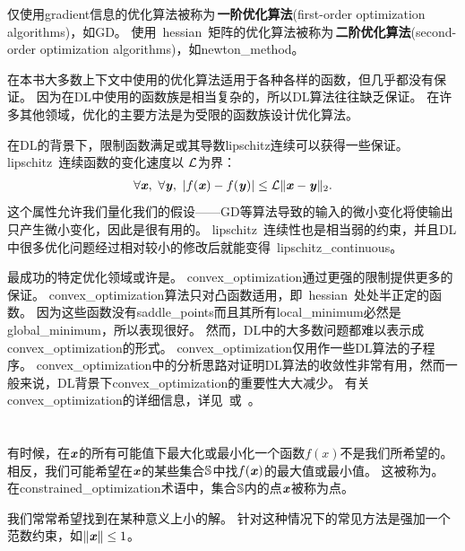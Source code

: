 仅使用\gls{gradient}信息的优化算法被称为\,\textbf{一阶优化算法}(first-order optimization algorithms)，如\gls{GD}。
使用~\gls{hessian}~矩阵的优化算法被称为\,\textbf{二阶优化算法}(second-order optimization algorithms)\citep{NumOptBook}，如\gls{newton_method}。

在本书大多数上下文中使用的优化算法适用于各种各样的函数，但几乎都没有保证。
因为在\gls{DL}中使用的函数族是相当复杂的，所以\gls{DL}算法往往缺乏保证。
在许多其他领域，优化的主要方法是为受限的函数族设计优化算法。

在\gls{DL}的背景下，限制函数满足或其导数\gls{lipschitz}连续可以获得一些保证。
\gls{lipschitz}~连续函数的变化速度以 $\mathcal{L}$为界：
\begin{align}
 \forall \boldsymbol{\mathit{x}},~\forall \boldsymbol{\mathit{y}}, ~| f(\boldsymbol{\mathit{x}}) - f(\boldsymbol{\mathit{y}})|  \leq \mathcal{L} \| \boldsymbol{\mathit{x}} - \boldsymbol{\mathit{y}} \|_2 .
\end{align}
这个属性允许我们量化我们的假设——\gls{GD}等算法导致的输入的微小变化将使输出只产生微小变化，因此是很有用的。
\gls{lipschitz}~连续性也是相当弱的约束，并且\gls{DL}中很多优化问题经过相对较小的修改后就能变得~\gls{lipschitz_continuous}。


最成功的特定优化领域或许是。
\gls{convex_optimization}通过更强的限制提供更多的保证。
\gls{convex_optimization}算法只对凸函数适用，即~\gls{hessian}~处处半正定的函数。
因为这些函数没有\gls{saddle_points}而且其所有\gls{local_minimum}必然是\gls{global_minimum}，所以表现很好。
然而，\gls{DL}中的大多数问题都难以表示成\gls{convex_optimization}的形式。
\gls{convex_optimization}仅用作一些\gls{DL}算法的子程序。
\gls{convex_optimization}中的分析思路对证明\gls{DL}算法的收敛性非常有用，然而一般来说，\gls{DL}背景下\gls{convex_optimization}的重要性大大减少。 
有关\gls{convex_optimization}的详细信息，详见~\cite{Boyd04}或~\cite{rockafellar1997convex}。


\section{}
\label{sec:constrained_optimization}
有时候，在$\boldsymbol{\mathit{x}}$的所有可能值下最大化或最小化一个函数$f(x)$不是我们所希望的。
相反，我们可能希望在$\boldsymbol{\mathit{x}}$的某些集合$\mathbb{S}$中找$f(\boldsymbol{\mathit{x}})$的最大值或最小值。
这被称为。
在\gls{constrained_optimization}术语中，集合$\mathbb{S}$内的点$\boldsymbol{\mathit{x}}$被称为点。

我们常常希望找到在某种意义上小的解。
针对这种情况下的常见方法是强加一个范数约束，如$\| \boldsymbol{\mathit{x}} \| \leq 1$。

